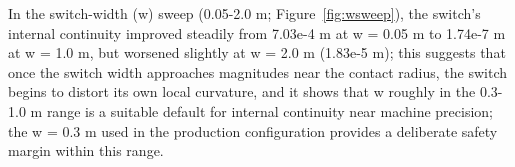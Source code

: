 In the switch-width (w) sweep (0.05-2.0 m; Figure~\ref{fig:wsweep}), the switch's internal continuity improved steadily from 7.03e-4 m at w = 0.05 m to 1.74e-7 m at w = 1.0 m, but worsened slightly at w = 2.0 m (1.83e-5 m); this suggests that once the switch width approaches magnitudes near the contact radius, the switch begins to distort its own local curvature, and it shows that w roughly in the 0.3-1.0 m range is a suitable default for internal continuity near machine precision; the w = 0.3 m used in the production configuration provides a deliberate safety margin within this range.
